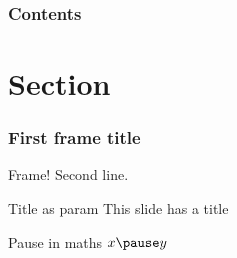 \documentclass{beamer}
\begin{document}
\begin{frame}
    \frametitle{Contents}
    \tableofcontents
\end{frame}

\section{Section}

\begin{frame}
    \frametitle{First frame title}
    Frame!
    \pause
    Second line.
\end{frame}

\begin{frame}{Title as param}
    This slide has a title
\end{frame}

\begin{frame}{Pause in maths}
    $x \pause y$
\end{frame}
\end{document}
